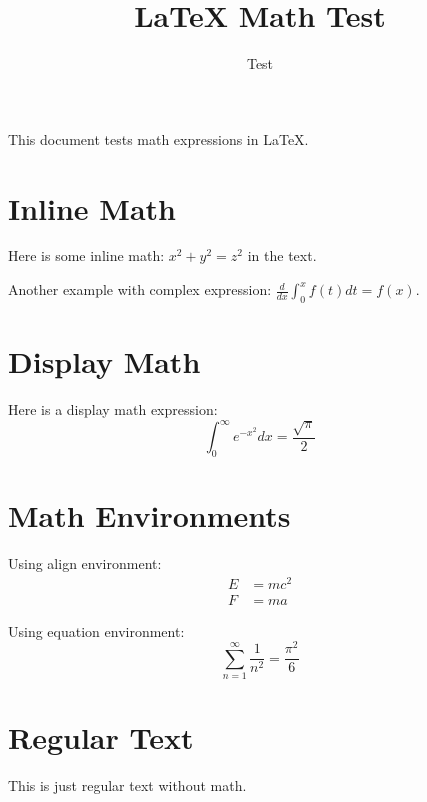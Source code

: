\documentclass{article}
\begin{document}
\title{LaTeX Math Test}
\author{Test}
\maketitle

This document tests math expressions in LaTeX.

\section{Inline Math}
Here is some inline math: $x^2 + y^2 = z^2$ in the text.

Another example with complex expression: $\frac{d}{dx}\int_{0}^{x} f(t) dt = f(x)$.

\section{Display Math}
Here is a display math expression:
$$\int_{0}^{\infty} e^{-x^2} dx = \frac{\sqrt{\pi}}{2}$$

\section{Math Environments}
Using align environment:
\begin{align}
E &= mc^2 \\
F &= ma
\end{align}

Using equation environment:
\begin{equation}
\sum_{n=1}^{\infty} \frac{1}{n^2} = \frac{\pi^2}{6}
\end{equation}

\section{Regular Text}
This is just regular text without math.
\end{document}
